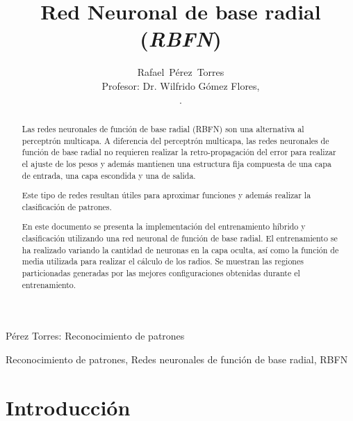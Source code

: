 \documentclass[journal]{IEEEtran}
\begin{document}

\title{Red Neuronal de base radial (\emph{RBFN})}

\author{Rafael~Pérez~Torres \\
	Profesor: Dr. Wilfrido Gómez Flores,\\[6pt].
	
}

%
{Pérez Torres: Reconocimiento de patrones}

\maketitle

\begin{abstract}
Las redes neuronales de función de base radial (RBFN) son una alternativa  al perceptrón multicapa.
A diferencia del perceptrón multicapa, las redes neuronales de función de base radial no requieren realizar la retro-propagación del error para realizar el ajuste de los pesos y además mantienen una estructura fija compuesta de una capa de entrada, una capa escondida y una de salida.

Este tipo de redes resultan útiles para aproximar funciones y además realizar la clasificación de patrones.

En este documento se presenta la implementación del entrenamiento híbrido y clasificación utilizando una red neuronal de función de base radial.
El entrenamiento se ha realizado variando la cantidad de neuronas en la capa oculta, así como la función de media utilizada para realizar el cálculo de los radios.
Se muestran las regiones particionadas generadas por las mejores configuraciones obtenidas durante el entrenamiento.
\end{abstract}

\begin{IEEEkeywords}
Reconocimiento de patrones, Redes neuronales de función de base radial, RBFN
\end{IEEEkeywords}

\section{Introducción}
\label{sec:introduccion}
\end{document}
